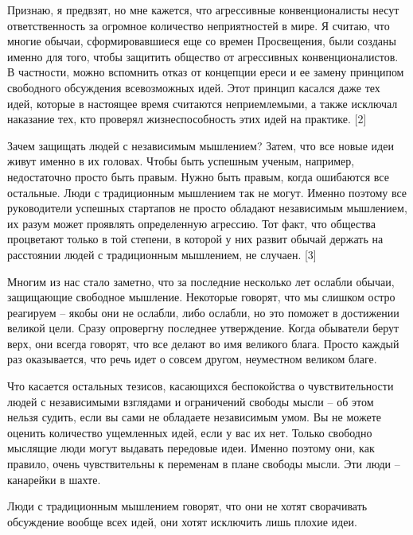 \documentclass[ebook,12pt,oneside,openany]{memoir}
\begin{document}
Признаю, я предвзят, но мне кажется, что агрессивные конвенционалисты
несут ответственность за огромное количество неприятностей в мире. Я
считаю, что многие обычаи, сформировавшиеся еще со времен Просвещения,
были созданы именно для того, чтобы защитить общество от агрессивных
конвенционалистов. В частности, можно вспомнить отказ от концепции
ереси и ее замену принципом свободного обсуждения всевозможных идей.
Этот принцип касался даже тех идей, которые в настоящее время
считаются неприемлемыми, а также исключал наказание тех, кто проверял
жизнеспособность этих идей на практике. [2] \newline

Зачем защищать людей с независимым мышлением? Затем, что все новые
идеи живут именно в их головах. Чтобы быть успешным ученым, например,
недостаточно просто быть правым. Нужно быть правым, когда ошибаются
все остальные. Люди с традиционным мышлением так не могут. Именно
поэтому все руководители успешных стартапов не просто обладают
независимым мышлением, их разум может проявлять определенную агрессию.
Тот факт, что общества процветают только в той степени, в которой у
них развит обычай держать на расстоянии людей с традиционным
мышлением, не случаен. [3] \newline

Многим из нас стало заметно, что за последние несколько лет ослабли
обычаи, защищающие свободное мышление. Некоторые говорят, что мы
слишком остро реагируем – якобы они не ослабли, либо ослабли, но это
поможет в достижении великой цели. Сразу опровергну последнее
утверждение. Когда обыватели берут верх, они всегда говорят, что все
делают во имя великого блага. Просто каждый раз оказывается, что речь
идет о совсем другом, неуместном великом благе. \newline

Что касается остальных тезисов, касающихся беспокойства о
чувствительности людей с независимыми взглядами и ограничений свободы
мысли – об этом нельзя судить, если вы сами не обладаете независимым
умом. Вы не можете оценить количество ущемленных идей, если у вас их
нет. Только свободно мыслящие люди могут выдавать передовые идеи.
Именно поэтому они, как правило, очень чувствительны к переменам в
плане свободы мысли. Эти люди – канарейки в шахте. \newline

Люди с традиционным мышлением говорят, что они не хотят сворачивать
обсуждение вообще всех идей, они хотят исключить лишь плохие идеи. \newline
\end{document}
